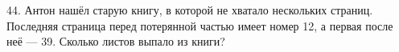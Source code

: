 44. Антон нашёл старую книгу, в которой не хватало нескольких страниц. Последняя страница перед потерянной частью имеет номер 12, а первая после неё --- 39. Сколько листов выпало из книги?\\
